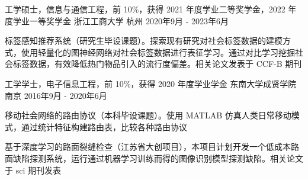 

\begin{cventries}

  \cventry
    {工学硕士，信息与通信工程，前 10\%，获得 2021 年度学业二等奖学金，2022 年度学业一等奖学金} %
    {浙江工商大学} %
    {杭州} %
    {2020年9月 - 2023年6月} %
    {
      \begin{cvitems}
        \item 标签感知推荐系统（研究生毕设课题）。探索现有研究对社会标签数据的建模方式，使用轻量化的图神经网络对社会标签数据进行表征学习。通过对比学习挖掘社会标签数据，有效降低热门物品引入的流行度偏差。相关论文发表于 CCF-B 期刊
      \end{cvitems}
    }

  \cventry
    {工学学士，电子信息工程，前 10\%，获得 2020 年度学业学金} %
    {东南大学成贤学院} %
    {南京} %
    {2016年9月 - 2020年6月} %
    {
      \begin{cvitems}
        \item 移动社会网络的路由协议（本科毕设课题）。使用 MATLAB 仿真人类日常移动模式，通过统计特征构建路由表，比较各种路由协议
        \item 基于深度学习的路面裂缝检查（江苏省大创项目），本项目计划开发一个低成本路面缺陷探测系统，运行通过机器学习训练而得的图像识别模型探测缺陷。相关论文于 sci 期刊发表
      \end{cvitems}
    }
\end{cventries}
